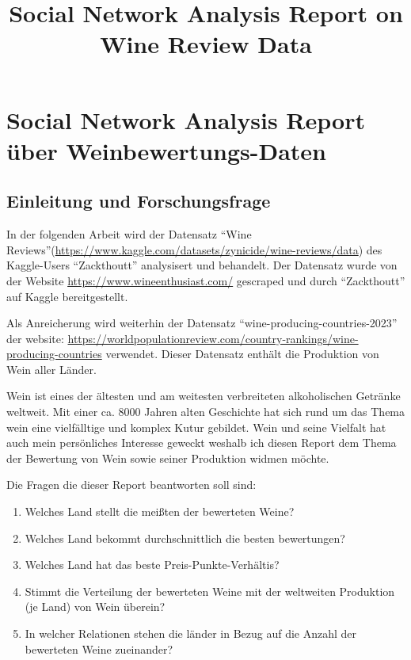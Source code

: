 \documentclass[
]{article}
\title{Social Network Analysis Report on Wine Review Data}
\author{}
\date{\vspace{-2.5em}}
\providecommand{\tightlist}{%
  \setlength{\itemsep}{0pt}\setlength{\parskip}{0pt}}
\begin{document}
\maketitle

\section{Social Network Analysis Report über
Weinbewertungs-Daten}\label{social-network-analysis-report-uxfcber-weinbewertungs-daten}

\subsection{Einleitung und
Forschungsfrage}\label{einleitung-und-forschungsfrage}

In der folgenden Arbeit wird der Datensatz ``Wine
Reviews''(\url{https://www.kaggle.com/datasets/zynicide/wine-reviews/data})
des Kaggle-Users ``Zackthoutt'' analysisert und behandelt. Der Datensatz
wurde von der Website \url{https://www.wineenthusiast.com/} gescraped
und durch ``Zackthoutt'' auf Kaggle bereitgestellt.

Als Anreicherung wird weiterhin der Datensatz
``wine-producing-countries-2023'' der website:
\url{https://worldpopulationreview.com/country-rankings/wine-producing-countries}
verwendet. Dieser Datensatz enthält die Produktion von Wein aller
Länder.

Wein ist eines der ältesten und am weitesten verbreiteten alkoholischen
Getränke weltweit. Mit einer ca. 8000 Jahren alten Geschichte hat sich
rund um das Thema wein eine vielfälltige und komplex Kutur gebildet.
Wein und seine Vielfalt hat auch mein persönliches Interesse geweckt
weshalb ich diesen Report dem Thema der Bewertung von Wein sowie seiner
Produktion widmen möchte.

Die Fragen die dieser Report beantworten soll sind:

\begin{enumerate}
\def\labelenumi{\arabic{enumi}.}
\tightlist
\item
  Welches Land stellt die meißten der bewerteten Weine?
\item
  Welches Land bekommt durchschnittlich die besten bewertungen?
\item
  Welches Land hat das beste Preis-Punkte-Verhältis?
\item
  Stimmt die Verteilung der bewerteten Weine mit der weltweiten
  Produktion (je Land) von Wein überein?
\item
  In welcher Relationen stehen die länder in Bezug auf die Anzahl der
  bewerteten Weine zueinander?
\end{enumerate}
\end{document}
